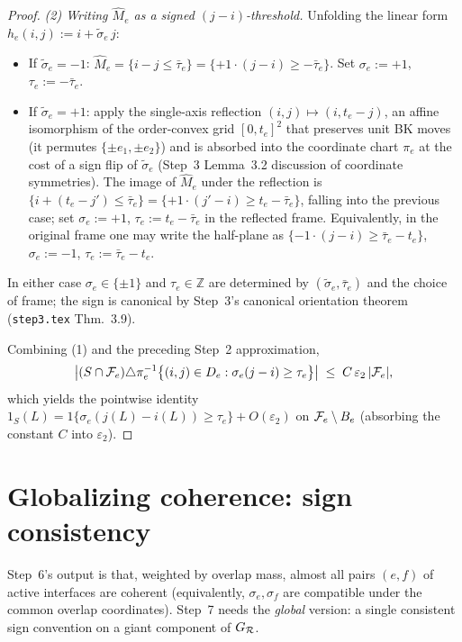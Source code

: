 \begin{proof}
\smallskip
\noindent\emph{(2) Writing $\hat M_e$ as a signed $(j-i)$-threshold.}
Unfolding the linear form $h_e(i,j):=i+\tilde\sigma_e\,j$:
\begin{itemize}[nosep,topsep=2pt]
  \item If $\tilde\sigma_e=-1$: $\hat M_e=\{i-j\le\bar\tau_e\}=
    \{+1\cdot(j-i)\ge-\bar\tau_e\}$.  Set $\sigma_e:=+1$,
    $\tau_e:=-\bar\tau_e$.
  \item If $\tilde\sigma_e=+1$: apply the single-axis reflection
    $(i,j)\mapsto(i,t_e-j)$, an affine isomorphism of the
    order-convex grid $[0,t_e]^2$ that preserves unit BK moves (it
    permutes $\{\pm e_1,\pm e_2\}$) and is absorbed into the
    coordinate chart $\pi_e$ at the cost of a sign flip of
    $\tilde\sigma_e$ (Step~3 Lemma~3.2 discussion of coordinate
    symmetries).  The image of $\hat M_e$ under the
    reflection is $\{i+(t_e-j')\le\bar\tau_e\}=
    \{+1\cdot(j'-i)\ge t_e-\bar\tau_e\}$, falling into the previous
    case; set $\sigma_e:=+1$, $\tau_e:=t_e-\bar\tau_e$ in the
    reflected frame.  Equivalently, in the original frame one may
    write the half-plane as $\{-1\cdot(j-i)\ge\bar\tau_e-t_e\}$,
    $\sigma_e:=-1$, $\tau_e:=\bar\tau_e-t_e$.
\end{itemize}
In either case $\sigma_e\in\{\pm 1\}$ and $\tau_e\in\mathbb{Z}$ are
determined by $(\tilde\sigma_e,\bar\tau_e)$ and the choice of frame;
the sign is canonical by Step~3's canonical orientation theorem
(\texttt{step3.tex} Thm.~3.9).

Combining (1) and the preceding Step~2 approximation,
\[
  \bigl|(S\cap\mathcal{F}_{e})\triangle
    \pi_e^{-1}\bigl\{(i,j)\in D_e:\sigma_e(j-i)\ge\tau_e\bigr\}\bigr|
  \;\le\; C\,\varepsilon_2\,|\mathcal{F}_{e}|,
\]
which yields the pointwise identity
$1_S(L)=1\{\sigma_e(j(L)-i(L))\ge\tau_e\}+O(\varepsilon_2)$ on
$\mathcal{F}_{e}\setminus B_e$ (absorbing the constant $C$ into
$\varepsilon_2$).
\end{proof}

\section{Globalizing coherence: sign consistency}\label{sec:sign}

Step~6's output is that, weighted by overlap mass, almost all pairs
$(e,f)$ of active interfaces are coherent (equivalently,
$\sigma_e,\sigma_f$ are compatible under the common overlap
coordinates).
Step~7 needs the \emph{global} version: a single consistent sign
convention on a giant component of $G_{\mathcal{R}}$.

